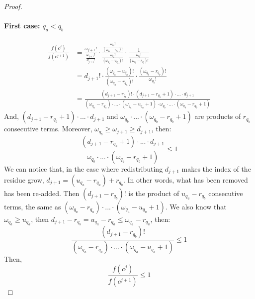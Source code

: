 \documentclass[jair,twoside,11pt,theapa]{article}
\begin{document}
\begin{proof}
\paragraph{First case: $q_a < q_b$}
\begin{align*}
	\frac{f(c^j)}{f(c^{j+1})} &= \frac{\omega_{j+1}!}{\frac{\omega_{j+1}!}{d_{j+1}!}} \cdot \frac{\frac{\omega_{q_a}!}{(\omega_{q_a}-r_{q_a})!}}{\frac{\omega_{q_a}!}{(\omega_{q_a}-u_{q_a})!}} \cdot \frac{1}{\frac{\omega_{q_b}!}{(\omega_{q_b}-r_{q_b})!}} \\
	&= d_{j+1}! \cdot \frac{(\omega_{q_a}-u_{q_a})!}{(\omega_{q_a}-r_{q_a})!} \cdot \frac{(\omega_{q_b}-r_{q_b})!}{\omega_{q_b}!} \\
	&= \frac{ (d_{j+1}-r_{q_b})! \cdot (d_{j+1} - r_{q_b} +1) \cdot ... \cdot d_{j+1}}      {(\omega_{q_a}-r_{q_a}) \cdot ... \cdot (\omega_{q_a} - u_{q_a}+1) \cdot \omega_{q_b} \cdot ... \cdot (\omega_{q_b}-r_{q_b}+1)}
\end{align*}
And, $(d_{j+1} - r_{q_b} +1) \cdot ... \cdot d_{j+1}$ and $\omega_{q_b} \cdot ... \cdot (\omega_{q_b}-r_{q_b}+1)$ are products of $r_{q_b}$ consecutive terms. Moreover, $\omega_{q_b} \geq \omega_{j+1} \geq d_{j+1}$, then:
\begin{equation*}
	\frac{(d_{j+1} - r_{q_b} +1) \cdot ... \cdot d_{j+1}}{\omega_{q_b} \cdot ... \cdot (\omega_{q_b}-r_{q_b}+1)} \leq 1
\end{equation*}
We can notice that, in the case where redistributing $d_{j+1}$ makes the index of the residue grow, $d_{j+1} = (u_{q_a}-r_{q_a}) + r_{q_b}$. In other words, what has been removed has been re-added. Then $(d_{j+1}-r_{q_b})!$ is the product of $u_{q_a}-r_{q_b}$ consecutive terms, the same as $(\omega_{q_a}-r_{q_a}) \cdot ... \cdot (\omega_{q_a} - u_{q_a}+1)$. We also know that $\omega_{q_a} \geq u_{q_a}$, then $d_{j+1} - r_{q_b} = u_{q_a}-r_{q_a} \leq \omega_{q_a} - r_{q_a}$, then:
\begin{equation*}
	\frac{(d_{j+1}-r_{q_b})!}{(\omega_{q_a}-r_{q_a}) \cdot ... \cdot (\omega_{q_a} - u_{q_a}+1)} \leq 1
\end{equation*}
Then, 
\begin{equation*}
	\frac{f(c^j)}{f(c^{j+1})} \leq 1
\end{equation*}


\end{proof}
\end{document}
